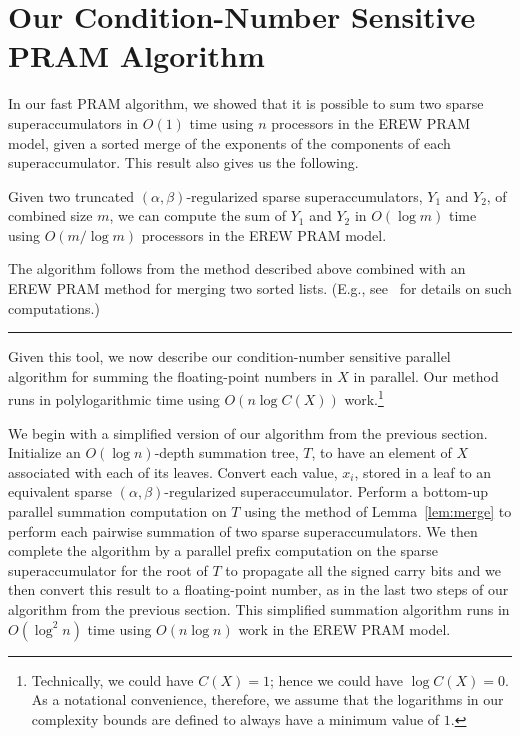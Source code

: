\documentclass[11pt]{article}
\newenvironment{proof}{\noindent{\bf Proof:}}{\hspace*{\fill}\rule{6pt}{6pt}\bigskip}
\begin{document}
\section{Our Condition-Number Sensitive PRAM Algorithm}

In our fast PRAM algorithm, we showed that it is possible to sum
two sparse superaccumulators in $O(1)$ time using $n$ processors
in the EREW PRAM model, given a sorted merge of the exponents of the
components of each superaccumulator.
This result also gives us the following.

\begin{lemma}
\label{lem:merge}
Given two truncated
$(\alpha,\beta)$-regularized sparse superaccumulators, $Y_1$ and $Y_2$,
of combined size $m$, we can
compute the sum of $Y_1$ and $Y_2$
in $O(\log m)$ time using $O(m/\log m)$ processors
in the EREW PRAM model.
\end{lemma}
\begin{proof}
The algorithm follows from the method described above combined
with an EREW PRAM method for merging two sorted lists.
(E.g., see~\cite{DBLP:books/aw/JaJa92} for details on such computations.)
\end{proof}

Given this tool, we now describe our 
condition-number sensitive parallel algorithm for summing
the floating-point numbers in $X$ in parallel.
Our method runs in polylogarithmic time using $O(n\log C(X))$ 
work.\footnote{Technically, we could have $C(X)=1$; 
  hence we could have $\log C(X)=0$. As a notational convenience, 
  therefore, we assume that the
  logarithms in our complexity bounds 
  are defined to always have a minimum value of $1$.}

We begin with a simplified version of our algorithm 
from the previous section.
Initialize an $O(\log n)$-depth summation tree, $T$, to have an element of
$X$ associated with each of its leaves.
Convert each value, $x_i$, stored in a leaf 
to an equivalent sparse $(\alpha,\beta)$-regularized
superaccumulator.
Perform a bottom-up parallel summation computation on $T$ using the method of
Lemma~\ref{lem:merge} to perform each pairwise summation of two sparse
superaccumulators.
We then complete the algorithm by a parallel prefix computation on the sparse
superaccumulator for the root of $T$ to propagate all the 
signed carry bits and we then convert this result
to a floating-point number, as in the last two steps
of our algorithm from the previous section.  
This simplified summation algorithm
runs in
$O(\log^2 n)$ time using $O(n\log n)$ work in the EREW PRAM model.
\end{document}

